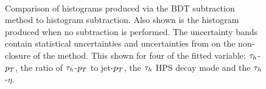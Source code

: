 \begin{figure}[!hbtp]
\centering
     \\
\caption[Plots of the validation of the BDT subtraction method.]{Comparison of histograms produced via the BDT subtraction method to histogram subtraction. Also shown is the histogram produced when no subtraction is performed. The uncertainty bands contain statistical uncertainties and uncertainties from on the non-closure of the method. This shown for four of the fitted variable: $\tau_{h}$-$p_{T}$, the ratio of $\tau_{h}$-$p_{T}$ to jet-$p_{T}$, the $\tau_{h}$ HPS decay mode and the $\tau_{h}$-$\eta$.}
\label{fig:4tau_ff_subtraction}
\end{figure}

